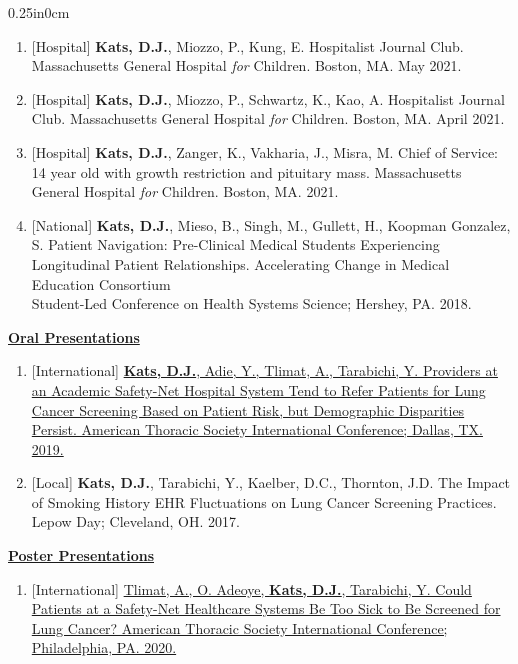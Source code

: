 \documentclass[11pt]{article}
\newcommand{\bibsec}[1]{\underline{\normalsize\bfseries#1}}
\newcommand{\blockindent}{0.25in}
\begin{document}
\begin{adjustwidth}{\blockindent}{0cm}
\begin{enumerate}[resume]
		\item\label{journalclub21b}[Hospital] \textbf{Kats, D.J.}, Miozzo, P., Kung, E. Hospitalist Journal Club. Massachusetts General Hospital \textit{for} Children. Boston, MA. May 2021.

		\item\label{journalclub21a}[Hospital] \textbf{Kats, D.J.}, Miozzo, P., Schwartz, K., Kao, A. Hospitalist Journal Club. Massachusetts General Hospital \textit{for} Children. Boston, MA. April 2021.

		\item\label{cos21}[Hospital] \textbf{Kats, D.J.}, Zanger, K., Vakharia, J., Misra, M. Chief of Service: 14 year old with growth restriction and pituitary mass. Massachusetts General Hospital \textit{for} Children. Boston, MA. 2021.

		\item\label{amaace18}[National] \textbf{Kats, D.J.}, Mieso, B., Singh, M., Gullett, H., Koopman Gonzalez, S. Patient Navigation: Pre-Clinical Medical Students Experiencing Longitudinal Patient Relationships. Accelerating Change in Medical Education Consortium\\Student-Led Conference on Health Systems Science; Hershey, PA. 2018.

	\end{enumerate}

\bibsec{Oral Presentations}
	\begin{enumerate}[resume]

		\item\label{ats19oral}[International] \href{https://www.dankats.com/research/ATS2019Symposium.pdf}{\textbf{Kats, D.J.}, Adie, Y., Tlimat, A., Tarabichi, Y. Providers at an Academic Safety-Net Hospital System Tend to Refer Patients for Lung Cancer Screening Based on Patient Risk, but Demographic Disparities Persist. American Thoracic Society International Conference; Dallas, TX. 2019.}

		\item\label{lepow17}[Local] \textbf{Kats, D.J.}, Tarabichi, Y., Kaelber, D.C., Thornton, J.D. The Impact of Smoking History EHR Fluctuations on Lung Cancer Screening Practices. Lepow Day; Cleveland, OH. 2017.

	\end{enumerate}

\bibsec{Poster Presentations}
	\begin{enumerate}[resume]

		\item\label{ats20tlimat}[International] \href{https://www.atsjournals.org/doi/pdf/10.1164/ajrccm-conference.2020.201.1_MeetingAbstracts.A5933}{Tlimat, A., O. Adeoye, \textbf{Kats, D.J.}, Tarabichi, Y. Could Patients at a Safety-Net Healthcare Systems Be Too Sick to Be Screened for Lung Cancer? American Thoracic Society International Conference; Philadelphia, PA. 2020.}


\end{enumerate}
\end{adjustwidth}
\end{document}
